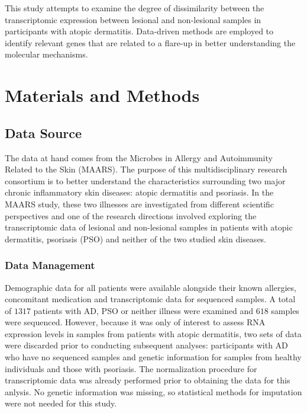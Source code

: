 \documentclass[journal, a4paper]{IEEEtran}
\begin{document}
This study attempts to examine the degree of dissimilarity between the transcriptomic expression between lesional and non-lesional samples in participants with atopic dermatitis. Data-driven methods are employed to identify relevant genes that are related to a flare-up in better understanding the molecular mechanisms.

\section{\textbf{Materials and Methods}}

\subsection{\textbf{Data Source}}

The data at hand comes from the Microbes in Allergy and Autoimmunity Related to the Skin (MAARS). The purpose of this multidisciplinary research consortium is to better understand the characteristics surrounding two major chronic inflammatory skin diseases: atopic dermatitis and psoriasis\cite{MAARS}. In the MAARS study, these two illnesses are investigated from different scientific perspectives and one of the research directions involved exploring the transcriptomic data of lesional and non-lesional samples in patients with atopic dermatitis, psoriasis (PSO) and neither of the two studied skin diseases.\\


\subsubsection*{\textbf{Data Management}}

Demographic data for all patients were available alongside their known allergies, concomitant medication and transcriptomic data for sequenced samples. A total of $1317$ patients with AD, PSO or neither illness were examined and $618$ samples were sequenced. However, because it was only of interest to assess RNA expression levels in samples from patients with atopic dermatitis, two sets of data were discarded prior to conducting subsequent analyses: participants with AD who have no sequenced samples and genetic information for samples from healthy individuals and those with psoriasis. The normalization procedure for transcriptomic data was already performed prior to obtaining the data for this anlysis. No genetic information was missing, so statistical methods for imputation were not needed for this study.
\end{document}
